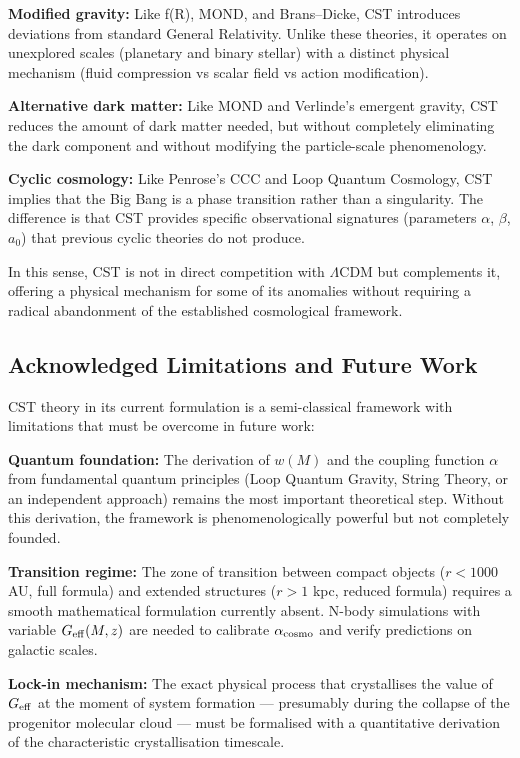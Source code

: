 \documentclass[11pt,a4paper]{article}
\begin{document}
\textbf{Modified gravity:} Like f(R), MOND, and Brans--Dicke, CST
introduces deviations from standard General Relativity. Unlike these
theories, it operates on unexplored scales (planetary and binary
stellar) with a distinct physical mechanism (fluid compression vs scalar
field vs action modification).

\textbf{Alternative dark matter:} Like MOND and Verlinde's emergent
gravity, CST reduces the amount of dark matter needed, but without
completely eliminating the dark component and without modifying the
particle-scale phenomenology.

\textbf{Cyclic cosmology:} Like Penrose's CCC and Loop Quantum
Cosmology, CST implies that the Big Bang is a phase transition rather
than a singularity. The difference is that CST provides specific
observational signatures (parameters \(\alpha\), \(\beta\), \(a_0\))
that previous cyclic theories do not produce.

In this sense, CST is not in direct competition with \(\Lambda\)CDM but
complements it, offering a physical mechanism for some of its anomalies
without requiring a radical abandonment of the established cosmological
framework.

\hypertarget{acknowledged-limitations-and-future-work}{%
\subsection{Acknowledged Limitations and Future
Work}\label{acknowledged-limitations-and-future-work}}

CST theory in its current formulation is a semi-classical framework with
limitations that must be overcome in future work:

\textbf{Quantum foundation:} The derivation of \(w(M)\) and the coupling
function \(\alpha\) from fundamental quantum principles (Loop Quantum
Gravity, String Theory, or an independent approach) remains the most
important theoretical step. Without this derivation, the framework is
phenomenologically powerful but not completely founded.

\textbf{Transition regime:} The zone of transition between compact
objects (\(r < 1000\) AU, full formula) and extended structures
(\(r > 1\) kpc, reduced formula) requires a smooth mathematical
formulation currently absent. N-body simulations with variable
\(G_{\rm eff}(M,z)\) are needed to calibrate \(\alpha_{\rm cosmo}\) and
verify predictions on galactic scales.

\textbf{Lock-in mechanism:} The exact physical process that crystallises
the value of \(G_{\rm eff}\) at the moment of system formation ---
presumably during the collapse of the progenitor molecular cloud ---
must be formalised with a quantitative derivation of the characteristic
crystallisation timescale.
\end{document}
